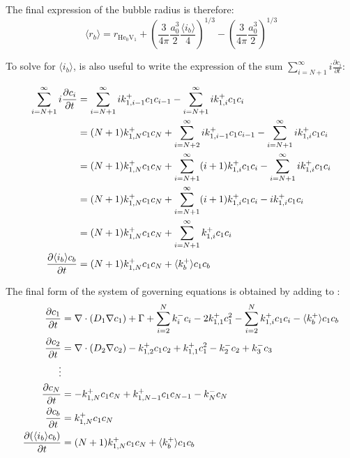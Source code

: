 The final expression of the bubble radius is therefore:
\begin{equation}
    \langle r_b \rangle = r_{\mathrm{He}_0 \mathrm{V}_1} + \left(\frac{3}{4 \pi} \frac{a_0^3}{2} \frac{\langle i_b \rangle}{4} \right)^{1/3} - \left(\frac{3}{4 \pi} \frac{a_0^3}{2} \right)^{1/3}
\end{equation}

To solve for $\langle i_b \rangle$, is also useful to write the expression of the sum $\sum\limits_{i=N+1}^\infty i \frac{\partial c_i}{\partial t}$:

\begin{align}
    \sum\limits_{i=N+1}^\infty i \frac{\partial c_i}{\partial t} &= \sum\limits_{i=N+1}^\infty i k_{1,i-1}^+ c_1 c_{i-1} - \sum\limits_{i=N+1}^\infty i k_{1,i}^+ c_1 c_{i} \nonumber\\
    &= (N+1) k_{1,N}^+ c_1 c_N + \sum\limits_{i=N+2}^\infty i k_{1,i-1}^+ c_1 c_{i-1} - \sum\limits_{i=N+1}^\infty i k_{1,i}^+ c_1 c_{i} \nonumber\\
    &= (N+1) k_{1,N}^+ c_1 c_N + \sum\limits_{i=N+1}^\infty (i + 1) k_{1,i}^+ c_1 c_{i} - \sum\limits_{i=N+1}^\infty i k_{1,i}^+ c_1 c_{i} \nonumber\\
    &= (N+1) k_{1,N}^+ c_1 c_N + \sum\limits_{i=N+1}^\infty (i + 1) k_{1,i}^+ c_1 c_{i} - i k_{1,i}^+ c_1 c_{i} \nonumber\\
    &= (N+1) k_{1,N}^+ c_1 c_N + \sum\limits_{i=N+1}^\infty k_{1,i}^+ c_1 c_{i} \nonumber\\
    \frac{\partial \langle i_b \rangle c_b}{\partial t} &= (N+1) k_{1,N}^+ c_1 c_N + \langle k_b^+ \rangle c_1 c_b
    \labeq{pde for d (cb ib)/ dt}
\end{align}

The final form of the system of governing equations is obtained by adding  to :
\begin{subequations}
    \begin{align}
        \frac{\partial c_1}{\partial t} &= \nabla \cdot (D_1 \nabla c_1) + \Gamma + \sum\limits_{i=2}^N k_{i}^- c_i- 2k_{1, 1}^+ c_1^2 - \sum\limits_{i=2}^N k_{1,i}^+ c_1 c_i - \langle k_b^+ \rangle c_1 c_b \\
        \frac{\partial c_2}{\partial t} &= \nabla \cdot (D_2 \nabla c_2) - k_{1, 2}^+ c_1 c_2 + k_{1, 1}^+ c_1^2 - k_{2}^- c_2 + k_{3}^- c_3\\
        \vdots \nonumber\\
        \frac{\partial c_N}{\partial t} &= - k_{1, N}^+ c_1 c_N + k_{1, N-1}^+ c_1 c_{N-1} - k_{N}^- c_N\\
        \frac{\partial c_b}{\partial t} &= k_ {1,N}^+ c_1 c_N \\
        \frac{\partial (\langle i_b \rangle c_b)}{\partial t} &= (N+1)k_ {1,N}^+ c_1 c_N  + \langle k_b^+ \rangle c_1 c_b
    \end{align}
    \labeq{final system of equation}
\end{subequations}

